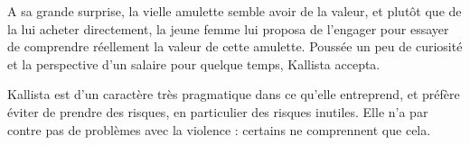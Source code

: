 \documentclass[10pt,a4paper]{article}
\begin{document}
A sa grande surprise, la vielle amulette semble avoir de la valeur, et plutôt que de la lui acheter directement, la jeune femme lui proposa de l'engager pour essayer de comprendre réellement la valeur de cette amulette. Poussée un peu de curiosité et la perspective d'un salaire pour quelque temps, Kallista accepta.

Kallista est d'un caractère très pragmatique dans ce qu'elle entreprend, et préfère éviter de prendre des risques, en particulier des risques inutiles. Elle n'a par contre pas de problèmes avec la violence : certains ne comprennent que cela.
\end{document}
